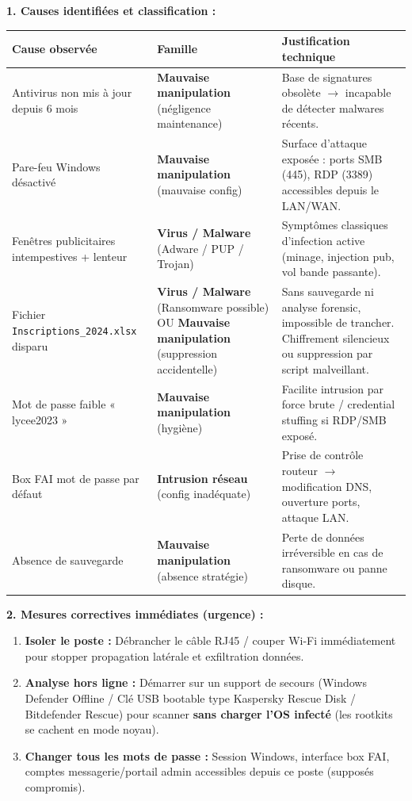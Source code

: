 \documentclass[11pt]{article}
\begin{document}
\begin{exoresolu}
\textbf{1. Causes identifiées et classification :}
\begin{center}
\begin{tabularx}{\linewidth}{|l|X|X|}
\hline
\rowcolor{popblueL}
\textbf{Cause observée} & \textbf{Famille} & \textbf{Justification technique} \\
\hline
Antivirus non mis à jour depuis 6 mois & \textbf{Mauvaise manipulation} (négligence maintenance) & Base de signatures obsolète $\rightarrow$ incapable de détecter malwares récents. \\
\hline
Pare-feu Windows désactivé & \textbf{Mauvaise manipulation} (mauvaise config) & Surface d'attaque exposée : ports SMB (445), RDP (3389) accessibles depuis le LAN/WAN. \\
\hline
Fenêtres publicitaires intempestives + lenteur & \textbf{Virus / Malware} (Adware / PUP / Trojan) & Symptômes classiques d'infection active (minage, injection pub, vol bande passante). \\
\hline
Fichier \texttt{Inscriptions\_2024.xlsx} disparu & \textbf{Virus / Malware} (Ransomware possible) OU \textbf{Mauvaise manipulation} (suppression accidentelle) & Sans sauvegarde ni analyse forensic, impossible de trancher. Chiffrement silencieux ou suppression par script malveillant. \\
\hline
Mot de passe faible « lycee2023 » & \textbf{Mauvaise manipulation} (hygiène) & Facilite intrusion par force brute / credential stuffing si RDP/SMB exposé. \\
\hline
Box FAI mot de passe par défaut & \textbf{Intrusion réseau} (config inadéquate) & Prise de contrôle routeur $\rightarrow$ modification DNS, ouverture ports, attaque LAN. \\
\hline
Absence de sauvegarde & \textbf{Mauvaise manipulation} (absence stratégie) & Perte de données irréversible en cas de ransomware ou panne disque. \\
\hline
\end{tabularx}
\end{center}

\textbf{2. Mesures correctives immédiates (urgence) :}
\begin{enumerate}
    \item \textbf{Isoler le poste :} Débrancher le câble RJ45 / couper Wi-Fi immédiatement pour stopper propagation latérale et exfiltration données.
    \item \textbf{Analyse hors ligne :} Démarrer sur un support de secours (Windows Defender Offline / Clé USB bootable type Kaspersky Rescue Disk / Bitdefender Rescue) pour scanner \textbf{sans charger l'OS infecté} (les rootkits se cachent en mode noyau).
    \item \textbf{Changer tous les mots de passe :} Session Windows, interface box FAI, comptes messagerie/portail admin accessibles depuis ce poste (supposés compromis).
\end{enumerate}


\end{exoresolu}
\end{document}
